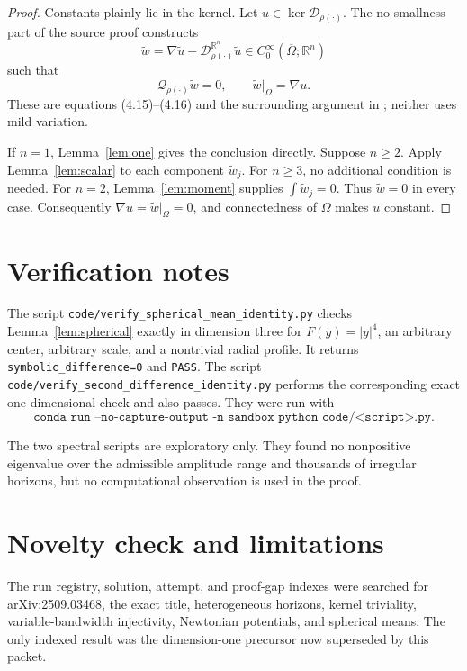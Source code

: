 \documentclass[11pt]{article}
\newcommand{\Dhet}{\mathcal D_{\rho(\cdot)}}
\newcommand{\Qhet}{\mathcal Q_{\rho(\cdot)}}
\begin{document}
\begin{proof}
Constants plainly lie in the kernel. Let \(u\in\ker\Dhet\). The
no-smallness part of the source proof constructs
\[
 \widetilde w
 =\nabla\widetilde u-\mathcal D_{\rho(\cdot)}^{\mathbb R^n}\widetilde u
 \in C_0^\infty(\overline\Omega;\mathbb R^n)
\]
such that
\[
 \Qhet\widetilde w=0,\qquad
 \widetilde w|_\Omega=\nabla u.
\]
These are equations (4.15)--(4.16) and the surrounding argument in
\cite[Theorem~4.17]{KS}; neither uses mild variation.

If \(n=1\), Lemma~\ref{lem:one} gives the conclusion directly. Suppose
\(n\geq2\). Apply Lemma~\ref{lem:scalar} to each component
\(\widetilde w_j\). For \(n\geq3\), no additional condition is needed. For
\(n=2\), Lemma~\ref{lem:moment} supplies
\(\int\widetilde w_j=0\). Thus \(\widetilde w=0\) in every case. Consequently
\(\nabla u=\widetilde w|_\Omega=0\), and connectedness of \(\Omega\) makes
\(u\) constant.
\end{proof}

\section*{Verification notes}

The script \texttt{code/verify\_spherical\_mean\_identity.py} checks
Lemma~\ref{lem:spherical} exactly in dimension three for
\(F(y)=|y|^4\), an arbitrary center, arbitrary scale, and a nontrivial radial
profile. It returns \texttt{symbolic\_difference=0} and \texttt{PASS}.
The script \texttt{code/verify\_second\_difference\_identity.py} performs the
corresponding exact one-dimensional check and also passes.
They were run with
\[
 \texttt{conda run --no-capture-output -n sandbox python code/<script>.py}.
\]

The two spectral scripts are exploratory only. They found no nonpositive
eigenvalue over the admissible amplitude range and thousands of irregular
horizons, but no computational observation is used in the proof.

\section*{Novelty check and limitations}

The run registry, solution, attempt, and proof-gap indexes were searched for
arXiv:2509.03468, the exact title, heterogeneous horizons, kernel triviality,
variable-bandwidth injectivity, Newtonian potentials, and spherical means.
The only indexed result was the dimension-one precursor now superseded by
this packet.
\end{document}
